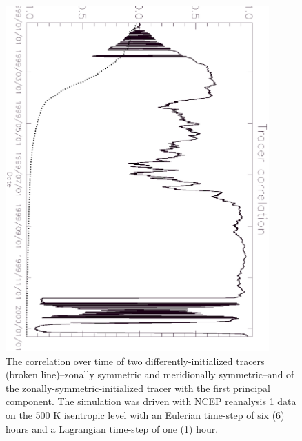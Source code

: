 \documentclass{article}
\begin{document}
\begin{figure}
\begin{center}
\includegraphics[angle=90,width=0.9\textwidth]{../pc_proxy/tcorr.eps}
\caption{The correlation over time of two differently-initialized tracers
(broken line)--zonally symmetric and meridionally symmetric--and of
the zonally-symmetric-initialized tracer with the first principal component.
The simulation was driven with NCEP reanalysis 1 data on the 500 K isentropic
level with an Eulerian time-step of six (6) hours and a Lagrangian time-step
of one (1) hour.}\label{tcorr}
\end{center}
\end{figure}
\end{document}
